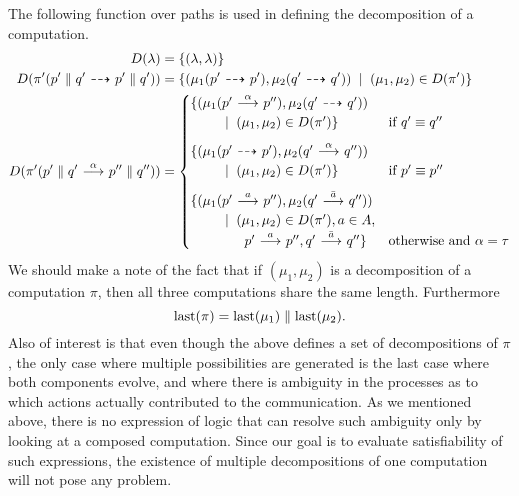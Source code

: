 The following function over paths is used in defining the decomposition of a computation.
\begin{align*}
    D(\lambda) &= \{(\lambda,\lambda)\} \\
    D(\pi'(p'\parallel q' \ {\stackrel{_{}}{\dashrightarrow}}\  p'\parallel q')) &=
        \{(\mu_1(p'\ {\stackrel{_{}}{\dashrightarrow}}\ p'),\mu_2(q'\ {\stackrel{_{}}{\dashrightarrow}}\ q')) \;\;|\;\; (\mu_1,\mu_2)\in D(\pi')\} \\
    D(\pi'(p'\parallel q' \ {\stackrel{{\alpha}}{\longrightarrow}}\  p''\parallel q'')) &=
        \begin{cases}
            \{(\mu_1(p' \ {\stackrel{{\alpha}}{\longrightarrow}}\  p''), \mu_2(q' \ {\stackrel{_{}}{\dashrightarrow}}\  q')) \\ \quad\quad
                \;\;|\;\; (\mu_1,\mu_2) \in D(\pi')\} & \textrm{if $q'\equiv q''$} \\[0.7em]
            \{(\mu_1(p' \ {\stackrel{_{}}{\dashrightarrow}}\  p'), \mu_2(q'\ {\stackrel{{\alpha}}{\longrightarrow}}\  q'')) \\ \quad\quad
                \;\;|\;\; (\mu_1,\mu_2) \in D(\pi')\} & \textrm{if $p'\equiv p''$} \\[0.7em]
            \{(\mu_1(p'\ {\stackrel{{a}}{\longrightarrow}}\ p''), \mu_2(q'\ {\stackrel{{\bar{a}}}{\longrightarrow}}\ q'')) \\ \quad\quad
                \;\;|\;\; (\mu_1,\mu_2) \in D(\pi'), a\in A, \\
                \qquad\qquad p'\ {\stackrel{{a}}{\longrightarrow}}\ p'', q'\ {\stackrel{{\bar{a}}}{\longrightarrow}}\ q''\}
                & \textrm{otherwise and $\alpha=\tau$}
        \end{cases}
\end{align*}
We should make a note of the fact that if $(\mu_1,\mu_2)$ is a decomposition
of a computation $\pi$, then all three computations share the same length.
Furthermore
\[
    \operatorname{last}(\pi) = \operatorname{last}(\mu_1) \parallel \operatorname{last}(\mu_2).
\]
%
Also of interest
is that even though the above defines a set of decompositions of $\pi$, the only
case where multiple possibilities are generated is the last case where both components
evolve, and where there is ambiguity in the processes as to which actions actually
contributed to the communication. As we mentioned above, there is no expression
of \HMLpast{} logic that can resolve such ambiguity only by looking at a composed
computation.
Since our goal is to evaluate satisfiability of such expressions, the
existence of multiple decompositions of one computation will not pose any problem.

